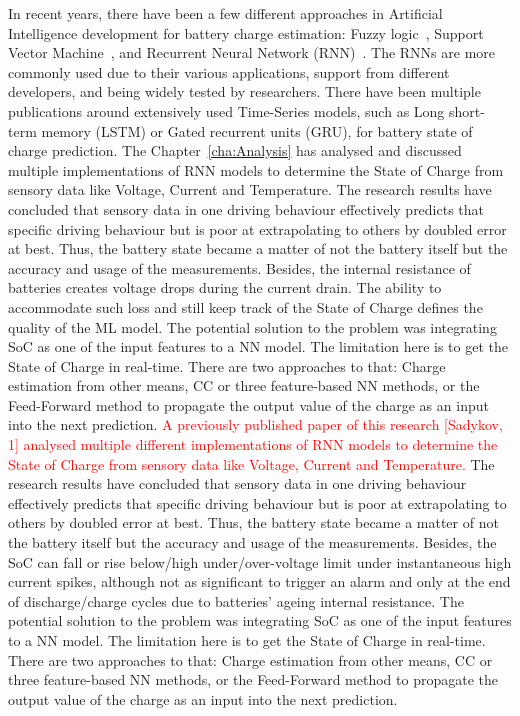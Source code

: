 %
In recent years, there have been a few different approaches in Artificial Intelligence development for battery charge estimation: Fuzzy logic~\cite{malkhandi_fuzzy_2006}, Support Vector Machine~\cite{hansen_support_2005, anton_battery_2013}, and Recurrent Neural Network (RNN)~\cite{song_lithium-ion_2018,Chemali2017,mamo_long_2020,jiao_gru-rnn_2020,xiao_accurate_2019,javid_adaptive_2020,zhang_deep_2020}.
The RNNs are more commonly used due to their various applications, support from different developers, and being widely tested by researchers.
There have been multiple publications around extensively used Time-Series models, such as Long short-term memory (LSTM) or Gated recurrent units (GRU), for battery state of charge prediction.
{
    The Chapter~\ref{cha:Analysis} has analysed and discussed multiple implementations of RNN models to determine the State of Charge from sensory data like Voltage, Current and Temperature.
    The research results have concluded that sensory data in one driving behaviour effectively predicts that specific driving behaviour but is poor at extrapolating to others by doubled error at best.
    Thus, the battery state became a matter of not the battery itself but the accuracy and usage of the measurements.
    Besides, the internal resistance of batteries creates voltage drops during the current drain.
    The ability to accommodate such loss and still keep track of the State of Charge defines the quality of the ML model.
    The potential solution to the problem was integrating SoC as one of the input features to a NN model.
    The limitation here is to get the State of Charge in real-time.
    There are two approaches to that: Charge estimation from other means, CC or three feature-based NN methods, or the Feed-Forward method to propagate the output value of the charge as an input into the next prediction.
} {
    \textcolor{red}{A previously published paper of this research [Sadykov, 1] analysed multiple different implementations of RNN models to determine the State of Charge from sensory data like Voltage, Current and Temperature.}
    The research results have concluded that sensory data in one driving behaviour effectively predicts that specific driving behaviour but is poor at extrapolating to others by doubled error at best.
    Thus, the battery state became a matter of not the battery itself but the accuracy and usage of the measurements.
    Besides, the SoC can fall or rise below/high under/over-voltage limit under instantaneous high current spikes, although not as significant to trigger an alarm and only at the end of discharge/charge cycles due to batteries' ageing internal resistance.
    The potential solution to the problem was integrating SoC as one of the input features to a NN model.
    The limitation here is to get the State of Charge in real-time.
    There are two approaches to that: Charge estimation from other means, CC or three feature-based NN methods, or the Feed-Forward method to propagate the output value of the charge as an input into the next prediction.
}


